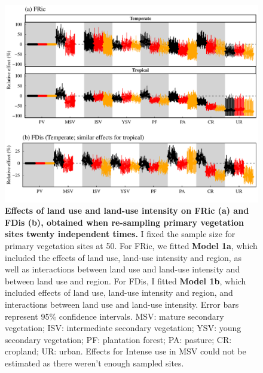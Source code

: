 \begin{figure}[h!]
\centering
\includegraphics[scale=0.7]{Supporting/Chapter3/Figures/Figure_SI_21}
\caption[Effects of land use and land-use intensity on FRic (a) and FDis (b), obtained when re-sampling primary vegetation sites twenty independent times]{\textbf{Effects of land use and land-use intensity on FRic (a) and FDis (b), obtained when re-sampling primary vegetation sites twenty independent times.} I fixed the sample size for primary vegetation sites at 50. For FRic, we fitted \textbf{Model 1a}, which included the effects of land use, land-use intensity and region, as well as interactions between land use and land-use intensity and between land use and region. For FDis, I fitted \textbf{Model 1b}, which included effects of land use, land-use intensity and region, and interactions between land use and land-use intensity. Error bars represent 95\% confidence intervals. MSV: mature secondary vegetation; ISV: intermediate secondary vegetation; YSV: young secondary vegetation; PF: plantation forest; PA: pasture; CR: cropland; UR: urban. Effects for Intense use in MSV could not be estimated as there weren’t enough sampled sites.}
\label{SI3_F21}
\end{figure}



